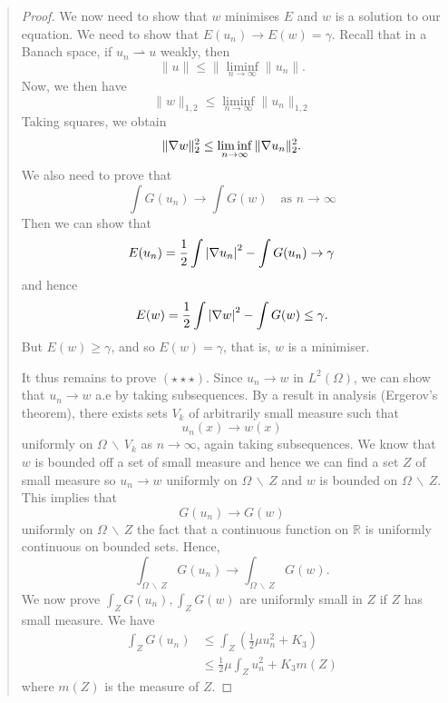 \documentclass[10pt, oneside, reqno]{amsart}
\theoremstyle{plain}%
\numberwithin{equation}{section}
\theoremstyle{definition}
\theoremstyle{remark}
\newcommand{\R}{\mathbb{R}}
\begin{document}
\begin{quote}
\begin{proof}
    We now need to show that $w$ minimises $E$ and $w$ is a solution to our equation.  We need to show that $E(u_n) \rightarrow E(w) = \gamma$. 
    Recall that in a Banach space, if $u_n \rightharpoonup u$ weakly, then \[
        \| u \| \leq \| \liminf_{n \rightarrow \infty} \| u_n \|.
    \]
    Now, we then have \[
        \| w \|_{1, 2} \leq \liminf_{n \rightarrow \infty}  \| u_n \|_{1, 2}
    \]  Taking squares, we obtain \[
        \| \nabla w \|_2^2 \leq \liminf_{n \rightarrow \infty} \| \nabla u_n \|_2^2.
    \]  We also need to prove that \[
        \tag{$\star \star \star$}
        \int G(u_n) \rightarrow \int G(w) \quad \text{as $n \rightarrow \infty$}
    \]  Then we can show that \[
        E(u_n) = \frac{1}{2} \int \left| \nabla u_n \right|^2 - \int G(u_n)  \rightarrow \gamma 
    \] and hence \[
        E(w) = \frac{1}{2} \int \left| \nabla w \right|^2 - \int G(w)  \leq \gamma.
    \] But $E(w) \geq \gamma$, and so $E(w) = \gamma$, that is, $w$ is a minimiser.
    
    It thus remains to prove $(\star \star \star)$.  Since $u_n \rightarrow w$ in $L^2(\Omega)$, we can show that $u_n \rightarrow w$ a.e by taking subsequences.  By a result in analysis (Ergerov's theorem), there exists sets $V_k$ of arbitrarily small measure such that \[
        u_n(x) \rightarrow w(x)
    \] uniformly on $\Omega \, \backslash \, V_k$ as $n \rightarrow \infty$, again taking subsequences.  We know that $w$ is bounded off a set of  small measure and hence we can find a set $Z$ of small measure so $u_n \rightarrow w$ uniformly on $\Omega \, \backslash \, Z$ and $w$ is bounded on $\Omega \, \backslash \, Z$.  This implies that \[
        G(u_n) \rightarrow G(w)
    \]  uniformly on $\Omega \, \backslash \, Z$ the fact that a continuous function on $\R$ is uniformly continuous on bounded sets.  Hence, \[
        \int_{\Omega \, \backslash \, Z} G(u_n) \rightarrow \int_{\Omega \, \backslash \, Z} G(w).
    \]  We now prove $\int_Z G(u_n), \int_Z G(w)$ are uniformly small in $Z$ if $Z$ has small measure.  We have \begin{align*}
        \int_Z G(u_n) &\leq \int_Z \left(\frac{1}{2} \mu u_n^2 + K_3 \right) \\
                    &\leq  \frac{1}{2} \mu \int_Z u_n^2 + K_3 m(Z) 
    \end{align*} where $m(Z)$ is the measure of $Z$.
    

\end{proof}
\end{quote}
\end{document}
